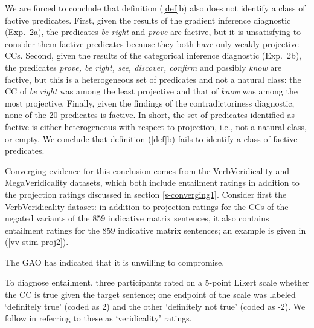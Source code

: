 \documentclass[11pt,fleqn]{article}
\newcommand{\6}{\mbox{$[\hspace*{-.6mm}[$}}
\newcommand{\9}{\mbox{$]\hspace*{-.6mm}]$}}
\begin{document}
We are forced to conclude that definition (\ref{def}b) also does not identify a class of factive predicates. First, given the results of the gradient inference diagnostic (Exp.~2a), the predicates {\em be right} and {\em prove} are factive, but it is unsatisfying to consider them factive predicates because they both have only weakly projective CCs. Second, given the results of the categorical inference diagnostic (Exp.~2b), the predicates {\em prove, be right, see, discover, confirm} and possibly {\em know} are factive, but this is a heterogeneous set of predicates and not a natural class: the CC of {\em be right} was among the least projective and that of {\em know} was among the most projective. Finally, given the findings of the contradictoriness diagnostic, none of the 20 predicates is factive. In short, the set of predicates identified as factive is either heterogeneous with respect to projection, i.e., not a natural class, or empty. We conclude that definition (\ref{def}b) fails to identify a class of factive predicates. 

Converging evidence for this conclusion comes from the VerbVeridicality and MegaVeridicality datasets, which both include entailment ratings in addition to the projection ratings discussed in section \ref{s-converging1}. Consider first the VerbVeridicality dataset: in addition to projection ratings for the CCs of the negated variants of the 859 indicative matrix sentences, it also contains entailment ratings for the 859 indicative matrix sentences; an example is given in (\ref{vv-stim-proj2}). 

\begin{exe}
\ex\label{vv-stim-proj2} The GAO has indicated that it is unwilling to compromise.
\end{exe}
To diagnose entailment, three participants rated on a 5-point Likert scale whether the CC is true given the target sentence; one endpoint of the scale was labeled `definitely true' (coded as 2) and the other `definitely not true' (coded as -2). We follow \citet{ross-pavlick2019} in referring to these as `veridicality' ratings. 
\end{document}
